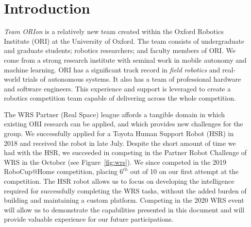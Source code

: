 \documentclass[runningheads,a4paper]{llncs}
\newcommand{\teamori}{Team ORIon}
\begin{document}

\section{Introduction}

\textit{\teamori{}} is a relatively new team created within the Oxford Robotics Institute
(ORI) at the University of Oxford. The team consists of undergraduate and
graduate students; robotics researchers; and faculty members of ORI. We come
from a strong research institute with seminal work in mobile autonomy and
machine learning. ORI has a significant track record in \emph{field robotics}
and real-world trials of autonomous systems. It also has a team of professional
hardware and software engineers. This experience and support is leveraged
to create a robotics competition team capable of delivering across the whole
competition. 

The WRS Partner (Real Space) league affords a tangible domain in
which existing ORI research can be applied, and which provides new challenges
for the group.
We successfully applied for a Toyota Human Support Robot (HSR) in 2018
and received the robot in late July. Despite the short amount of time we
had with the HSR, we succeeded in competing in the Partner Robot Challenge of WRS in the October (see Figure~\ref{fig:wrs}). We since competed in the 2019 RoboCup@Home competition, placing $6^{th}$ out of 10 on our first attempt at the competition. 
The HSR robot allows us to focus on developing the
intelligence required for successfully completing the WRS tasks, 
without the added burden of building and maintaining a custom platform. 
Competing in the 2020 WRS event will allow us to demonstrate 
the capabilities presented in this document and will provide valuable experience
for our future participations.
\end{document}
